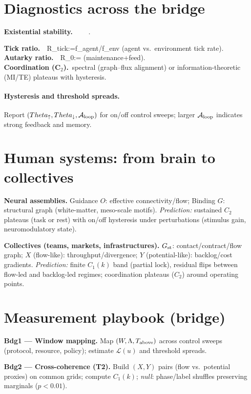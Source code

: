 \documentclass[12pt,a4paper,oneside]{scrreprt}
\def\Theta{Theta}%
\def\({}%
\def\){}%
\begin{document}
\section{Diagnostics across the bridge}\label{sec:bridge-diagnostics}
\textbf{Existential stability.}\ \ 
\(
\ \propto\ \cdot{}.
\)
\textbf{Tick ratio.}\ \
\(R_{\rm tick}:=f_{\rm agent}/f_{\rm env}\) (agent vs.\ environment tick rate).\\
\textbf{Autarky ratio.}\ \
\(R_0:=\) (maintenance+feed).\\
\textbf{Coordination (C$_2$).}\ spectral (graph–flux alignment) or information-theoretic (MI/TE) plateaus with hysteresis.

\paragraph{Hysteresis and threshold spreads.}
Report $(\Theta_\uparrow,\Theta_\downarrow,\mathcal A_{\rm loop})$ for on/off control sweeps; larger $\mathcal A_{\rm loop}$ indicates strong feedback and memory.

\section{Human systems: from brain to collectives}\label{sec:human-systems}
\textbf{Neural assemblies.} 
Guidance $O$: effective connectivity/flow; 
Binding $G$: structural graph (white-matter, meso-scale motifs). 
\emph{Prediction:} sustained $C_2$ plateaus (task or rest) with on/off hysteresis under perturbations (stimulus gain, neuromodulatory state).

\textbf{Collectives (teams, markets, infrastructures).}
$G_{\rm st}$: contact/contract/flow graph; 
$X$ (flow-like): throughput/divergence; $Y$ (potential-like): backlog/cost gradients. 
\emph{Prediction:} finite $C_1(k)$ band (partial lock), residual flips between flow-led and backlog-led regimes; coordination plateaus ($C_2$) around operating points.

\section{Measurement playbook (bridge)}\label{sec:bridge-playbook}
\textbf{Bdg1 — Window mapping.}
Map $(W,\Lambda,T_{\rm above})$ across control sweeps (protocol, resource, policy); estimate $\mathcal L(u)$ and threshold spreads.

\textbf{Bdg2 — Cross-coherence (T2).}
Build $(X,Y)$ pairs (flow vs.\ potential proxies) on common grids; compute $C_1(k)$; \emph{null}: phase/label shuffles preserving marginals ($p<0.01$).
\end{document}
